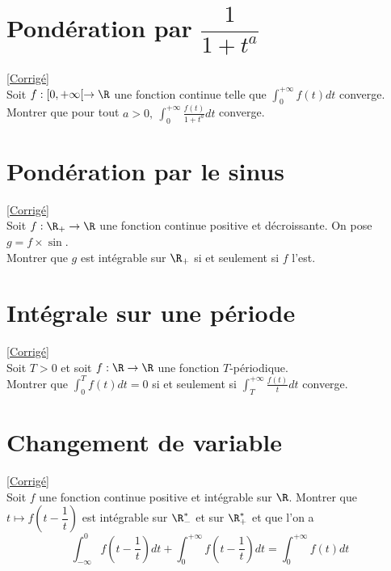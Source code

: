 \documentclass{book}
\begin{document}
	\section{Pondération par $\dfrac{1}{1+t^a}$}
	\textcolor{blue}{\hyperref[Pondération par 1/(1+t^a) corrigé]{[Corrigé]}}\\
	\label{Pondération par 1/(1+t^a)}
	Soit $f:[0,+\infty[\to \R$ une fonction continue telle que $\displaystyle\int_0^{+\infty}f(t)dt$ converge.\\
	Montrer que pour tout $a>0,\ \displaystyle\int_0^{+\infty}\frac{f(t)}{1+t^a}dt$ converge.
	
	\section{Pondération par le sinus}
	\textcolor{blue}{\hyperref[Pondération par le sinus corrigé]{[Corrigé]}}\\
	\label{Pondération par le sinus}
	Soit $f:\R_+\to \R$ une fonction continue positive et décroissante. On pose $g=f\times \sin$.\\
	Montrer que $g$ est intégrable sur $\R_+$ si et seulement si $f$ l'est.
	
	\section{Intégrale sur une période}
	\textcolor{blue}{\hyperref[Intégrale sur une période corrigé]{[Corrigé]}}\\
	\label{Intégrale sur une période}
	Soit $T>0$ et soit $f:\R\to\R$ une fonction $T$-périodique.\\
	Montrer que $\displaystyle\int_0^Tf(t)dt=0$ si et seulement si $\displaystyle\int_T^{+\infty}\frac{f(t)}{t}dt$ converge.
	
	\section{Changement de variable}
	\textcolor{blue}{\hyperref[Changement de variable corrigé]{[Corrigé]}}\\
	\label{Changement de variable}
	Soit $f$ une fonction continue positive et intégrable sur $\R$. Montrer que $t\mapsto f\left(t-\dfrac{1}{t}\right)$ est intégrable sur $\R^*_-$ et sur $\R^*_+$ et que l'on a
	$$\int_{-\infty}^0f\left(t-\frac{1}{t}\right)dt+\int_0^{+\infty}f\left(t-\frac{1}{t}\right)dt=\int_0^{+\infty}f(t)dt$$
	
\end{document}
